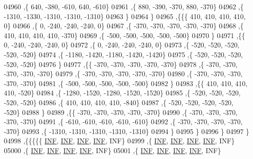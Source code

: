 \begin{DoxyCode}
04960     ,\{   640,  -380,  -610,   640,  -610\}
04961     ,\{   880,  -390,  -370,   880,  -370\}
04962     ,\{ -1310, -1330, -1310, -1310, -1310\}
04963     \}
04964    \}
04965   ,\{\{\{   410,   410,   410,   410,     0\}
04966     ,\{     0,  -240,  -240,  -240,     0\}
04967     ,\{  -370,  -370,  -370,  -370,  -370\}
04968     ,\{   410,   410,   410,   410,  -370\}
04969     ,\{  -500,  -500,  -500,  -500,  -500\}
04970     \}
04971    ,\{\{     0,  -240,  -240,  -240,     0\}
04972     ,\{     0,  -240,  -240,  -240,     0\}
04973     ,\{  -520,  -520,  -520,  -520,  -520\}
04974     ,\{ -1180, -1420, -1180, -1420, -1420\}
04975     ,\{  -520,  -520,  -520,  -520,  -520\}
04976     \}
04977    ,\{\{  -370,  -370,  -370,  -370,  -370\}
04978     ,\{  -370,  -370,  -370,  -370,  -370\}
04979     ,\{  -370,  -370,  -370,  -370,  -370\}
04980     ,\{  -370,  -370,  -370,  -370,  -370\}
04981     ,\{  -500,  -500,  -500,  -500,  -500\}
04982     \}
04983    ,\{\{   410,   410,   410,   410,  -520\}
04984     ,\{ -1280, -1520, -1280, -1520, -1520\}
04985     ,\{  -520,  -520,  -520,  -520,  -520\}
04986     ,\{   410,   410,   410,   410,  -840\}
04987     ,\{  -520,  -520,  -520,  -520,  -520\}
04988     \}
04989    ,\{\{  -370,  -370,  -370,  -370,  -370\}
04990     ,\{  -370,  -370,  -370,  -370,  -370\}
04991     ,\{  -610,  -610,  -610,  -610,  -610\}
04992     ,\{  -370,  -370,  -370,  -370,  -370\}
04993     ,\{ -1310, -1310, -1310, -1310, -1310\}
04994     \}
04995    \}
04996   \}
04997  \}
04998 ,\{\{\{\{\{   \hyperlink{energy__const_8h_a12c2040f25d8e3a7b9e1c2024c618cb6}{INF},   \hyperlink{energy__const_8h_a12c2040f25d8e3a7b9e1c2024c618cb6}{INF},   \hyperlink{energy__const_8h_a12c2040f25d8e3a7b9e1c2024c618cb6}{INF},   \hyperlink{energy__const_8h_a12c2040f25d8e3a7b9e1c2024c618cb6}{INF},   INF\}
04999     ,\{   \hyperlink{energy__const_8h_a12c2040f25d8e3a7b9e1c2024c618cb6}{INF},   \hyperlink{energy__const_8h_a12c2040f25d8e3a7b9e1c2024c618cb6}{INF},   \hyperlink{energy__const_8h_a12c2040f25d8e3a7b9e1c2024c618cb6}{INF},   \hyperlink{energy__const_8h_a12c2040f25d8e3a7b9e1c2024c618cb6}{INF},   INF\}
05000     ,\{   \hyperlink{energy__const_8h_a12c2040f25d8e3a7b9e1c2024c618cb6}{INF},   \hyperlink{energy__const_8h_a12c2040f25d8e3a7b9e1c2024c618cb6}{INF},   \hyperlink{energy__const_8h_a12c2040f25d8e3a7b9e1c2024c618cb6}{INF},   \hyperlink{energy__const_8h_a12c2040f25d8e3a7b9e1c2024c618cb6}{INF},   INF\}
05001     ,\{   \hyperlink{energy__const_8h_a12c2040f25d8e3a7b9e1c2024c618cb6}{INF},   \hyperlink{energy__const_8h_a12c2040f25d8e3a7b9e1c2024c618cb6}{INF},   \hyperlink{energy__const_8h_a12c2040f25d8e3a7b9e1c2024c618cb6}{INF},   \hyperlink{energy__const_8h_a12c2040f25d8e3a7b9e1c2024c618cb6}{INF},   INF\}

\end{DoxyCode}
